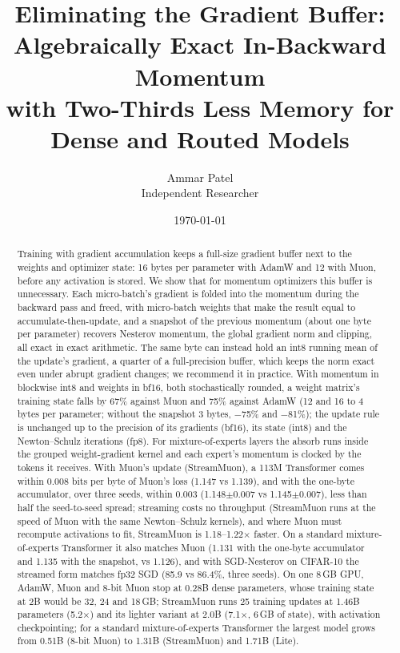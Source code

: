 \documentclass[10pt]{article}
\title{Eliminating the Gradient Buffer:\\ Algebraically Exact In-Backward Momentum\\ with Two-Thirds Less Memory for Dense and Routed Models}
\author{Ammar Patel\\ Independent Researcher}
\date{\today}
\begin{document}
\maketitle

\begin{abstract}
Training with gradient accumulation keeps a full-size gradient buffer next to the weights and optimizer state: 16 bytes
per parameter with AdamW and 12 with Muon, before any activation is stored. We show that for momentum optimizers this
buffer is unnecessary. Each micro-batch's gradient is folded into the momentum during the backward pass and freed, with
micro-batch weights that make the result equal to accumulate-then-update, and a snapshot of the previous
momentum (about one byte per parameter) recovers Nesterov momentum, the global gradient norm and clipping, all exact in exact arithmetic. The same byte can
instead hold an int8 running mean of the update's gradient, a quarter of a full-precision buffer, which keeps the norm
exact even under abrupt gradient changes; we recommend it in practice. With momentum
in blockwise int8 and weights in bf16, both stochastically rounded, a weight matrix's training state falls by 67\%
against Muon and 75\% against AdamW (12 and 16 to 4 bytes per parameter; without the snapshot 3 bytes, $-$75\% and
$-$81\%); the update rule is unchanged up to the precision of its gradients (bf16), its state (int8) and the Newton--Schulz iterations (fp8). For mixture-of-experts layers the absorb runs
inside the grouped weight-gradient kernel and each expert's momentum is clocked by the tokens it receives. With Muon's
update (StreamMuon), a 113M Transformer comes within 0.008 bits per byte of Muon's loss (1.147 vs 1.139), and with the one-byte accumulator, over three seeds, within 0.003 (1.148$\pm$0.007 vs 1.145$\pm$0.007), less than half the seed-to-seed spread;
streaming costs no throughput (StreamMuon runs at the speed of Muon with the same Newton--Schulz kernels), and where Muon
must recompute activations to fit, StreamMuon is 1.18--1.22$\times$ faster. On a standard mixture-of-experts
Transformer it also matches Muon (1.131 with the one-byte accumulator and 1.135 with the snapshot, vs 1.126), and with SGD-Nesterov on CIFAR-10 the streamed form
matches fp32 SGD (85.9 vs 86.4\%, three seeds). On
one 8\,GB GPU, AdamW, Muon and 8-bit Muon stop at 0.28B dense parameters, whose training state at 2B would be 32, 24 and
18\,GB; StreamMuon runs 25 training updates at 1.46B parameters (5.2$\times$) and its lighter variant at 2.0B (7.1$\times$,
6\,GB of state), with activation checkpointing; for a standard mixture-of-experts Transformer the largest
model grows from 0.51B (8-bit Muon) to 1.31B (StreamMuon) and 1.71B (Lite).
\end{abstract}
\end{document}
